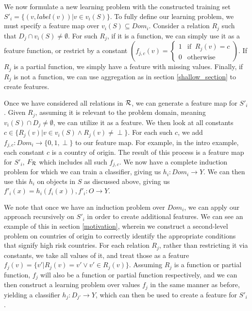 \documentclass[twoside,11pt]{article}
\theoremstyle{definition}
\begin{document}
We now formulate a new learning problem with the constructed training set
$S'_i = \{ (v, label(v)) | v \in v_i(S) \}$.
To fully define our learning problem, we must specify a feature map over $v_i(S)\subseteq Dom_i$. Consider a relation $R_j$ such that $D_j\cap v_i(S)\neq \emptyset$. For such $R_j$, if it is a function, we can simply use it as a feature function, or restrict by a constant $\left(f_{j,c}(v)=\begin{cases} 1 &\mbox{if } \ R_j(v)=c\\ 
0 & \mbox{otherwise } \end{cases}\right)$. If $R_j$ is a partial function, we simply have a feature with missing values. Finally, if $R_j$ is not a function, we can use aggregation as in section \ref{shallow_section} to create features.

Once we have considered all relations in ${\cal R}$, we can generate a feature map for $S'_i$. Given $R_j$, assuming it is relevant to the problem domain, meaning $v_i(S)\cap D_j\neq\emptyset$, we can utilize it as a feature. We then look at all constants $c\in \{R_j(v)|v\in v_i(S)\land R_j(v)\neq \perp\}$. For each such $c$, we add $f_{j,c}:Dom_i\rightarrow \{0,1,\perp\}$ to our feature map. 
For example, in the intro example, each constant $c$ is a country of origin.
The result of this process is a feature map for $S'_i$, $F_{\cal R}$ which includes all such $f_{j,c}$. We now have a complete induction problem for which we can train a classifier, giving us $h_i:Dom_i\rightarrow Y$. We can then use this $h_i$ on objects in $S$ as discussed above, giving us $f'_{i}(x)=h_{i}(f_{i}(x)), f'_{i}:O\rightarrow Y$. 

We note that once we have an induction problem over $Dom_i$, we can apply our approach recursively on $S'_i$ in order to create additional features. We can see an example of this in section \ref{motivation}, wherein we construct a second-level problem on countries of origin to correctly identify the appropriate conditions that signify high risk countries.
 For each relation $R_j$, rather than restricting it via constants, we take all values of it, and treat those as a feature $f_j(v)=\{v'|R_j(v)=v' \lor v'\in R_j(v) \}$. Assuming $R_j$ is a function or partial function, $f_j$ will also be a function or partial function respectively, and we can then construct a learning problem over values $f_j$ in the same manner as before, yielding a classifier $h_j:D_{j'}\rightarrow Y$, which can then be used to create a feature for $S'_i$. 
 
\end{document}
